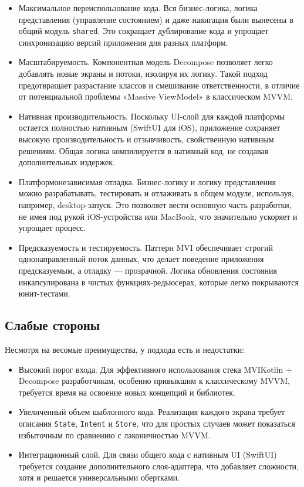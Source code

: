 \documentclass[14pt, russian]{scrartcl}
\begin{document}
\begin{itemize}
    \item Максимальное переиспользование кода. Вся бизнес-логика, логика представления (управление состоянием) и даже навигация были вынесены в общий модуль \texttt{shared}. Это сокращает дублирование кода и упрощает синхронизацию версий приложения для разных платформ.
    \item Масштабируемость. Компонентная модель Decompose позволяет легко добавлять новые экраны и потоки, изолируя их логику. Такой подход предотвращает разрастание классов и смешивание ответственности, в отличие от потенциальной проблемы «Massive ViewModel» в классическом MVVM.
    \item Нативная производительность. Поскольку UI-слой для каждой платформы остается полностью нативным (SwiftUI для iOS), приложение сохраняет высокую производительность и отзывчивость, свойственную нативным решениям. Общая логика компилируется в нативный код, не создавая дополнительных издержек.
    \item Платформонезависимая отладка. Бизнес-логику и логику представления можно разрабатывать, тестировать и отлаживать в общем модуле, используя, например, desktop-запуск. Это позволяет вести основную часть разработки, не имея под рукой iOS-устройства или MacBook, что значительно ускоряет и упрощает процесс.
    \item Предсказуемость и тестируемость. Паттерн MVI обеспечивает строгий однонаправленный поток данных, что делает поведение приложения предсказуемым, а отладку — прозрачной. Логика обновления состояния инкапсулирована в чистых функциях-редьюсерах, которые легко покрываются юнит-тестами.
\end{itemize}

\subsection{Слабые стороны}

Несмотря на весомые преимущества, у подхода есть и недостатки:

\begin{itemize}
    \item Высокий порог входа. Для эффективного использования стека MVIKotlin + Decompose разработчикам, особенно привыкшим к классическому MVVM, требуется время на освоение новых концепций и библиотек.
    \item Увеличенный объем шаблонного кода. Реализация каждого экрана требует описания \texttt{State}, \texttt{Intent} и \texttt{Store}, что для простых случаев может показаться избыточным по сравнению с лаконичностью MVVM.
    \item Интеграционный слой. Для связи общего кода с нативным UI (SwiftUI) требуется создание дополнительного слоя-адаптера, что добавляет сложности, хотя и решается универсальными обертками.
\end{itemize}
\end{document}
